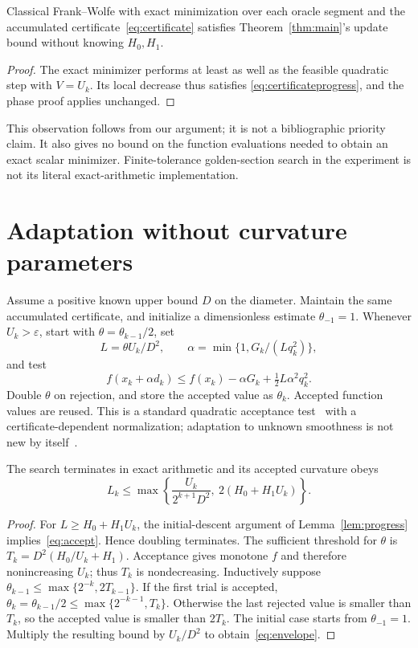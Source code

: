 \begin{proposition}\label{prop:exact}
Classical Frank--Wolfe with exact minimization over each oracle segment
and the accumulated certificate~\eqref{eq:certificate} satisfies
Theorem~\ref{thm:main}'s update bound without knowing $H_0,H_1$.
\end{proposition}
\begin{proof}
The exact minimizer performs at least as well as the feasible quadratic
step with $V=U_k$. Its local decrease thus satisfies
\eqref{eq:certificateprogress}, and the phase proof applies unchanged.
\end{proof}
This observation follows from our argument; it is not a bibliographic
priority claim. It also gives no bound on the function evaluations needed
to obtain an exact scalar minimizer. Finite-tolerance golden-section
search in the experiment is not its literal exact-arithmetic implementation.

\section{Adaptation without curvature parameters}
Assume a positive known upper bound $D$ on the diameter. Maintain the
same accumulated certificate, and initialize a dimensionless estimate
$\theta_{-1}=1$. Whenever $U_k>\varepsilon$, start with
$\theta=\theta_{k-1}/2$, set
\[
 L=\theta U_k/D^2,\qquad
 \alpha=\min\{1,G_k/(Lq_k^2)\},
\]
and test
\begin{equation}\label{eq:accept}
 f(x_k+\alpha d_k)\le f(x_k)-\alpha G_k
                          +\tfrac12L\alpha^2q_k^2.
\end{equation}
Double $\theta$ on rejection, and store the accepted value as $\theta_k$.
Accepted function values are reused. This is a standard quadratic
acceptance test~\cite{pedregosa} with a certificate-dependent normalization;
adaptation to unknown smoothness is not new by itself~\cite{autoconditioned}.

\begin{lemma}\label{lem:adaptive}
The search terminates in exact arithmetic and its accepted curvature obeys
\begin{equation}\label{eq:envelope}
 L_k\le\max\left\{\frac{U_k}{2^{k+1}D^2},\ 2(H_0+H_1U_k)\right\}.
\end{equation}
\end{lemma}
\begin{proof}
For $L\ge H_0+H_1U_k$, the initial-descent argument of
Lemma~\ref{lem:progress} implies~\eqref{eq:accept}. Hence doubling terminates.
The sufficient threshold for $\theta$ is
$T_k=D^2(H_0/U_k+H_1)$. Acceptance gives monotone $f$ and therefore
nonincreasing $U_k$; thus $T_k$ is nondecreasing.
Inductively suppose $\theta_{k-1}\le\max\{2^{-k},2T_{k-1}\}$.
If the first trial is accepted, $\theta_k=\theta_{k-1}/2
\le\max\{2^{-k-1},T_k\}$. Otherwise the last rejected value is smaller
than $T_k$, so the accepted value is smaller than $2T_k$.
The initial case starts from $\theta_{-1}=1$. Multiply the resulting
bound by $U_k/D^2$ to obtain~\eqref{eq:envelope}.
\end{proof}

